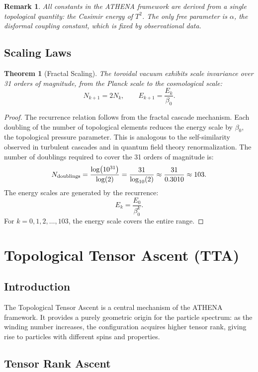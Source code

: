 \documentclass[12pt,oneside]{book}
\newtheorem{theorem}{Theorem}[chapter]
\newtheorem{remark}{Remark}[chapter]
\begin{document}
\begin{remark}
All constants in the ATHENA framework are derived from a single topological quantity: the Casimir energy of $T^2$. The only free parameter is $\alpha$, the disformal coupling constant, which is fixed by observational data.
\end{remark}

\section{Scaling Laws}

\begin{theorem}[Fractal Scaling]
The toroidal vacuum exhibits scale invariance over 31 orders of magnitude, from the Planck scale to the cosmological scale:
\[
N_{k+1} = 2N_k, \qquad E_{k+1} = \frac{E_k}{\beta_0}.
\]
\end{theorem}

\begin{proof}
The recurrence relation follows from the fractal cascade mechanism. Each doubling of the number of topological elements reduces the energy scale by $\beta_0$, the topological pressure parameter. This is analogous to the self-similarity observed in turbulent cascades and in quantum field theory renormalization. The number of doublings required to cover the 31 orders of magnitude is:
\[
N_{\rm doublings} = \frac{\log(10^{31})}{\log(2)} = \frac{31}{\log_{10}(2)} \approx \frac{31}{0.3010} \approx 103.
\]
The energy scales are generated by the recurrence:
\[
E_k = \frac{E_0}{\beta_0^k}.
\]
For $k = 0,1,2,\ldots,103$, the energy scale covers the entire range.
\end{proof}

\chapter{Topological Tensor Ascent (TTA)}

\section{Introduction}

The Topological Tensor Ascent is a central mechanism of the ATHENA framework. It provides a purely geometric origin for the particle spectrum: as the winding number increases, the configuration acquires higher tensor rank, giving rise to particles with different spins and properties.

\section{Tensor Rank Ascent}
\end{document}
